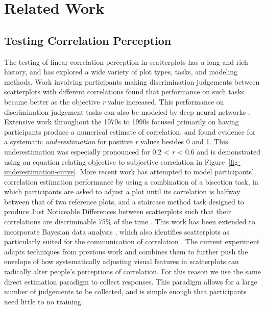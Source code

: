 \documentclass[manuscript, review, anonymous, screen]{acmart}
\begin{document}
\hypertarget{sec-related-work}{%
\section{Related Work}\label{sec-related-work}}

\hypertarget{sec-testing-corr-percept}{%
\subsection{Testing Correlation
Perception}\label{sec-testing-corr-percept}}

The testing of linear correlation perception in scatterplots has a long
and rich history, and has explored a wide variety of plot types, tasks,
and modeling methods. Work involving participants making discrimination
judgements between scatterplots with different correlations
\citep{pollack_1960, doherty_2007} found that performance on such tasks
became better as the objective \emph{r} value increased. This
performance on discrimination judgement tasks can also be modeled by
deep neural networks \citep{yang_2023}. Extensive work throughout the
1970s to 1990s focused primarily on having participants produce a
numerical estimate of correlation, and found evidence for a systematic
\emph{underestimation} for positive \emph{r} values besides 0 and 1.
This underestimation was especially pronounced for 0.2 \textless{}
\emph{r} \textless{} 0.6
\citep{strahan_1978, bobko_1979, cleveland_1982, lane_1985, lauer_1989, collyer_1990, meyer_1992}
and is demonstrated using an equation relating objective to subjective
correlation \citep{rensink_2017} in
Figure~\ref{fig-underestimation-curve}. More recent work has attempted
to model participants' correlation estimation performance by using a
combination of a bisection task, in which participants are asked to
adjust a plot until its correlation is halfway between that of two
reference plots, and a staircase method task designed to produce Just
Noticeable Differences between scatterplots such that their correlations
are discriminable 75\% of the time \citep{rensink_2010}. This work has
been extended to incorporate Bayesian data analysis \citep{kay_2015},
which also identifies scatterplots as particularly suited for the
communication of correlation \citep{li_2010, harrison_2014}. The current
experiment adapts techniques from previous work
\citep{strain_2023, strain_2023b} and combines them to further push the
envelope of how systematically adjusting visual features in scatterplots
can radically alter people's perceptions of correlation. For this reason
we use the same direct estimation paradigm to collect responses. This
paradigm allows for a large number of judgements to be collected, and is
simple enough that participants need little to no training.
\end{document}
